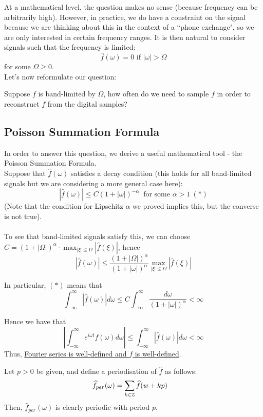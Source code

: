 \documentclass{article}
\begin{document}
At a mathematical level, the question makes no sense (because frequency can be arbitrarily high). However, in practice, we do have a constraint on the signal because we are thinking about this in the context of a ``phone exchange", so we are only interested in certain frequency ranges. It is then natural to consider signals such that the frequency is limited:
\[\widehat{f}(\omega) = 0 \text{ if $|\omega| > \Omega$}\]
for some $\Omega \geq 0$.\\

Let's now reformulate our question:
\begin{question}
    Suppose $f$ is band-limited by $\Omega$, how often do we need to sample $f$ in order to reconstruct $f$ from the digital samples?
\end{question}

\subsection{Poisson Summation Formula}
In order to answer this question, we derive a useful mathematical tool - the Poisson Summation Formula.\\

Suppose that $\widehat{f}(\omega)$ satisfies a decay condition (this holds for all band-limited signals but we are considering a more general case here):
\[|\widehat{f}(\omega)| \leq C (1 + |\omega|)^{-\alpha}\ \text{ for some $\alpha > 1$}\ (*)\]
(Note that the condition for Lipschitz $\alpha$ we proved implies this, but the converse is not true).\\\\

To see that band-limited signals satisfy this, we can choose $C = (1 + |\Omega|)^{\alpha} \cdot \max_{|\xi| \leq \Omega} |\widehat{f}(\xi)|$, hence
\[|\widehat{f}(\omega)| \leq \frac{(1 + |\Omega|)^{\alpha}}{(1 + |\omega|)^{\alpha}} \max_{|\xi| \leq \Omega} |\widehat{f}(\xi)|\]

In particular, $(*)$ means that
\[\int_{-\infty}^\infty |\widehat{f}(\omega)| d\omega \leq C \int_{-\infty}^\infty \frac{d\omega}{(1 + |\omega|)^\alpha} < \infty\]

Hence we have that
\[|\int_{-\infty}^\infty e^{i\omega t} \widehat{f}(\omega) d\omega| \leq \int_{-\infty}^\infty |\widehat{f}(\omega)| d\omega < \infty\]
Thus, \underline{Fourier series is well-defined and $f$ is well-defined}.\\

\begin{definition}
Let $p > 0$ be given, and define a periodisation of $\widehat{f}$ as follows:
\begin{align*}
    \widehat{f}_{per}(\omega) &= \sum_{k \in \mathbb{Z}} \widehat{f}(w + kp)
\end{align*}
Then, $\widehat{f}_{per}(\omega)$ is clearly periodic with period $p$. 
\end{definition}
\end{document}
